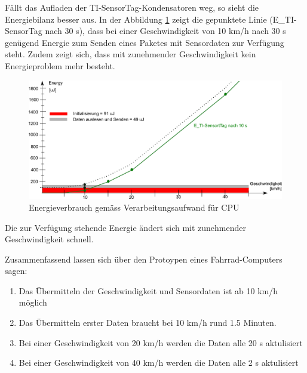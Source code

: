 Fällt das Aufladen der TI-SensorTag-Kondensatoren weg, so sieht die Energiebilanz besser aus. In der Abbildung \ref{r_bild_e_zusammenfassung_ohneSockel} zeigt die gepunktete Linie (E\_TI-SensorTag nach 30 s), dass bei einer Geschwindigkeit von 10 km/h nach 30 s genügend Energie zum Senden eines Paketes mit Sensordaten zur Verfügung steht. Zudem zeigt sich, dass mit zunehmender Geschwindigkeit kein Energieproblem mehr besteht. 


\begin{figure}[ht]
     \includegraphics[width=1\textwidth]{4Resultate/imag/EnergyVerbrauchZusammenfassung_ohneSockel.png}
     \caption{Energieverbrauch gem\"{a}ss Verarbeitungsaufwand für CPU}
     \label{r_bild_e_zusammenfassung_ohneSockel}
\end{figure}

Die zur Verfügung stehende Energie ändert sich mit zunehmender Geschwindigkeit schnell.

Zusammenfassend lassen sich über den Protoypen eines Fahrrad-Computers sagen:

\begin{minipage}{\textwidth}
    \begin{enumerate}
    \item Das Übermitteln der Geschwindigkeit und Sensordaten ist ab 10 km/h möglich
    \item Das Übermitteln erster Daten braucht bei 10 km/h rund 1.5 Minuten.
    \item Bei einer Geschwindigkeit von 20 km/h werden die Daten alle 20 s aktulisiert
    \item Bei einer Geschwindigkeit von 40 km/h werden die Daten alle 2 s aktulisiert
    \end{enumerate}
\end{minipage}


